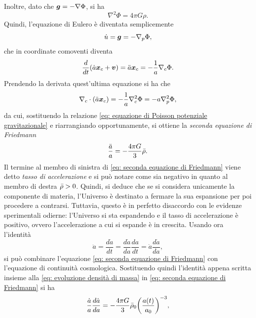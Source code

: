 Inoltre, dato che $\bm{g} = -\nabla\Phi$, si ha
\begin{equation}
\label{eq: equazione di Poisson potenziale gravitazionale}
    \nabla^2\Phi = 4\pi G\rho.
\end{equation}
Quindi, l'equazione di Eulero è diventata semplicemente
\begin{equation}
    \dot{u} = \bm{g} = -\nabla_p\Phi,
\end{equation}
che in coordinate comoventi diventa
\begin{equation}
    \frac{d}{dt}(\dot{a}\bm{x}_c + \bm{v}) = \ddot{a}\bm{x}_c = -\frac{1}{a}\nabla_c\Phi.
\end{equation}
Prendendo la derivata quest'ultima equazione si ha che
\begin{equation}
    \nabla_c \cdot (\ddot{a}\bm{x}_c) = -\frac{1}{a}\nabla_c^2\Phi = -a\nabla_p^2\Phi,
\end{equation}
da cui, sostituendo la relazione \eqref{eq: equazione di Poisson potenziale gravitazionale} e riarrangiando opportunamente, si ottiene la \emph{seconda equazione di Friedmann}
\begin{equation}
\label{eq: seconda equazione di Friedmann}
    \frac{\ddot{a}}{a} = -\frac{4\pi G}{3}\bar{\rho}.
\end{equation}
Il termine al membro di sinistra di \eqref{eq: seconda equazione di Friedmann} viene detto \emph{tasso di accelerazione} e si può notare come sia negativo in quanto al membro di destra $\bar{\rho} > 0$. Quindi, si deduce che se si considera unicamente la componente di materia, l'Universo è destinato a fermare la sua espansione per poi procedere a contrarsi. Tuttavia, questo è in perfetto disaccordo con le evidenze sperimentali odierne: l'Universo si sta espandendo e il tasso di accelerazione è positivo, ovvero l'accelerazione a cui si espande è in crescita. Usando ora l'identità 
\begin{equation}
    \ddot{a} = \frac{d\dot{a}}{dt} = \frac{d\dot{a}}{da}\frac{da}{dt} = \dot{a}\frac{d\dot{a}}{da},
\end{equation}
si può combinare l'equazione \eqref{eq: seconda equazione di Friedmann} con l'equazione di continuità cosmologica. Sostituendo quindi l'identità appena scritta insieme alla \eqref{eq: evoluzione densità di massa} in \eqref{eq: seconda equazione di Friedmann} si ha
\begin{equation}
    \frac{\dot{a}}{a}\frac{d\dot{a}}{da} = -\frac{4\pi G}{3}\bar{\rho}_0\bigg(\frac{a(t)}{a_0}\bigg)^{-3},
\end{equation}
